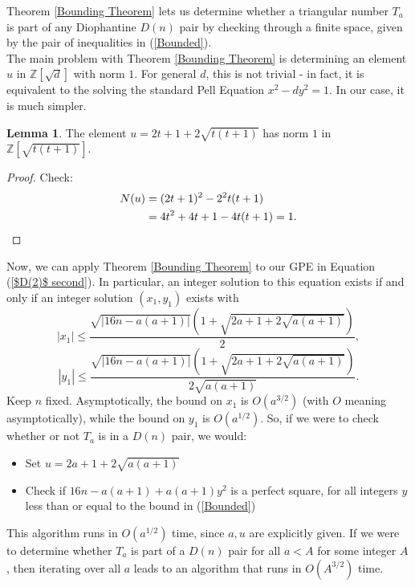 \documentclass[12pt]{amsart}
\theoremstyle{theorem}
\theoremstyle{definition}
\newtheorem{lemma}[theorem]{Lemma}
\theoremstyle{plain}
\begin{document}
Theorem \ref{Bounding Theorem} lets us determine whether a triangular number $T_a$ is part of any Diophantine $D(n)$ pair by checking through a finite space, given by the pair of inequalities in (\ref{Bounded}).
\\

The main problem with Theorem \ref{Bounding Theorem} is determining an element $u$ in $\mathbb{Z}[\sqrt{d}]$ with norm $1$. For general $d$, this is not trivial - in fact, it is equivalent to the solving the standard Pell Equation $x^2 - dy^2 = 1$. In our case, it is much simpler.

\begin{lemma}\label{unit}
    The element $u = 2t + 1 + 2 \sqrt{t(t+1)}$ has norm $1$ in $\mathbb{Z}[\sqrt{t(t+1)}]$.
\end{lemma}
\begin{proof}
    Check: 
    \begin{align*}
        N(u) &= (2t+1)^2 - 2^2 t(t+1) \\
        &= 4t^2 + 4t + 1 - 4t(t+1) = 1. \qedhere
    \end{align*}
\end{proof}

Now, we can apply Theorem \ref{Bounding Theorem} to our GPE in Equation (\ref{$D(2)$ second}). In particular, an integer solution to this equation exists if and only if an integer solution $(x_1, y_1)$ exists with $$|x_1| \le \frac{\sqrt{|16n - a(a+1)|} \left(1 + \sqrt{2a + 1 + 2\sqrt{a(a+1)}} \right)}{2},$$  $$|y_1| \le \frac{\sqrt{|16n - a(a+1)|} \left(1 +\sqrt{2a + 1 + 2\sqrt{a(a+1)}} \right)}{2 \sqrt{a(a+1)}}.$$ Keep $n$ fixed. Asymptotically, the bound on $x_1$ is $O(a^{3/2})$ (with $O$ meaning asymptotically), while the bound on $y_1$ is $O(a^{1/2})$. So, if we were to check whether or not $T_a$ is in a $D(n)$ pair, we would:
\\

\begin{itemize}
    \item Set $u = 2a + 1 + 2 \sqrt{a(a+1)}$
    \item Check if $16n - a(a+1) + a(a+1) y^2$ is a perfect square, for all integers $y$ less than or equal to the bound in (\ref{Bounded}) \\
\end{itemize}

This algorithm runs in $O(a^{1/2})$ time, since $a,u$ are explicitly given. If we were to determine whether $T_a$ is part of a $D(n)$ pair for all $a < A$ for some integer $A$, then iterating over all $a$ leads to an algorithm that runs in $O(A^{3/2})$ time. 
\\
\end{document}
